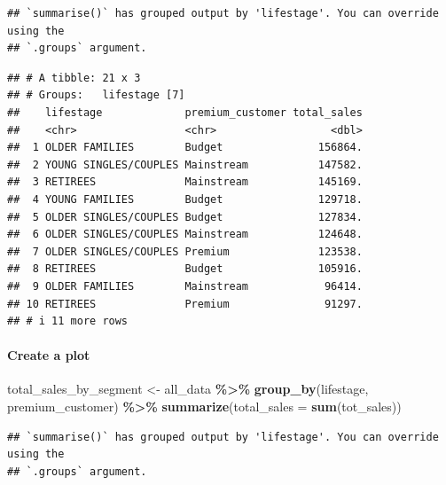 \documentclass[
]{article}
\newenvironment{Shaded}{\begin{snugshade}}{\end{snugshade}}
\newcommand{\AttributeTok}[1]{\textcolor[rgb]{0.13,0.29,0.53}{#1}}
\newcommand{\FunctionTok}[1]{\textcolor[rgb]{0.13,0.29,0.53}{\textbf{#1}}}
\newcommand{\NormalTok}[1]{#1}
\newcommand{\OtherTok}[1]{\textcolor[rgb]{0.56,0.35,0.01}{#1}}
\newcommand{\SpecialCharTok}[1]{\textcolor[rgb]{0.81,0.36,0.00}{\textbf{#1}}}
\begin{document}
\begin{verbatim}
## `summarise()` has grouped output by 'lifestage'. You can override using the
## `.groups` argument.
\end{verbatim}

\begin{verbatim}
## # A tibble: 21 x 3
## # Groups:   lifestage [7]
##    lifestage             premium_customer total_sales
##    <chr>                 <chr>                  <dbl>
##  1 OLDER FAMILIES        Budget               156864.
##  2 YOUNG SINGLES/COUPLES Mainstream           147582.
##  3 RETIREES              Mainstream           145169.
##  4 YOUNG FAMILIES        Budget               129718.
##  5 OLDER SINGLES/COUPLES Budget               127834.
##  6 OLDER SINGLES/COUPLES Mainstream           124648.
##  7 OLDER SINGLES/COUPLES Premium              123538.
##  8 RETIREES              Budget               105916.
##  9 OLDER FAMILIES        Mainstream            96414.
## 10 RETIREES              Premium               91297.
## # i 11 more rows
\end{verbatim}

\hypertarget{create-a-plot}{%
\paragraph{Create a plot}\label{create-a-plot}}

\begin{Shaded}
\begin{Highlighting}[]
\NormalTok{total\_sales\_by\_segment }\OtherTok{\textless{}{-}}\NormalTok{ all\_data }\SpecialCharTok{\%\textgreater{}\%}
  \FunctionTok{group\_by}\NormalTok{(lifestage, premium\_customer) }\SpecialCharTok{\%\textgreater{}\%}
  \FunctionTok{summarize}\NormalTok{(}\AttributeTok{total\_sales =} \FunctionTok{sum}\NormalTok{(tot\_sales))}
\end{Highlighting}
\end{Shaded}

\begin{verbatim}
## `summarise()` has grouped output by 'lifestage'. You can override using the
## `.groups` argument.
\end{verbatim}
\end{document}
